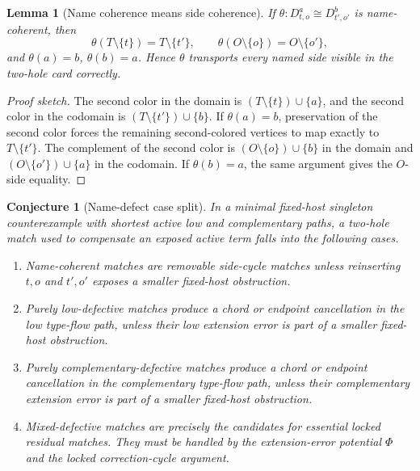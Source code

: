\documentclass[11pt]{article}
\newtheorem{lemma}{Lemma}
\newtheorem{conjecture}{Conjecture}
\begin{document}
\begin{lemma}[Name coherence means side coherence]
If \(\theta:D_{t,o}^a\cong D_{t',o'}^b\) is name-coherent, then
\[
  \theta(T\setminus\{t\})=T\setminus\{t'\},
  \qquad
  \theta(O\setminus\{o\})=O\setminus\{o'\},
\]
and \(\theta(a)=b\), \(\theta(b)=a\).  Hence \(\theta\) transports every named
side visible in the two-hole card correctly.
\end{lemma}

\begin{proof}[Proof sketch]
The second color in the domain is \((T\setminus\{t\})\cup\{a\}\), and the
second color in the codomain is \((T\setminus\{t'\})\cup\{b\}\).  If
\(\theta(a)=b\), preservation of the second color forces the remaining
second-colored vertices to map exactly to \(T\setminus\{t'\}\).  The complement
of the second color is \((O\setminus\{o\})\cup\{b\}\) in the domain and
\((O\setminus\{o'\})\cup\{a\}\) in the codomain.  If \(\theta(b)=a\), the same
argument gives the \(O\)-side equality.
\end{proof}

\begin{conjecture}[Name-defect case split]
In a minimal fixed-host singleton counterexample with shortest active low and
complementary paths, a two-hole match used to compensate an exposed active
term falls into the following cases.

\begin{enumerate}[leftmargin=2em]
  \item Name-coherent matches are removable side-cycle matches unless
  reinserting \(t,o\) and \(t',o'\) exposes a smaller fixed-host obstruction.

  \item Purely low-defective matches produce a chord or endpoint cancellation
  in the low type-flow path, unless their low extension error is part of a
  smaller fixed-host obstruction.

  \item Purely complementary-defective matches produce a chord or endpoint
  cancellation in the complementary type-flow path, unless their complementary
  extension error is part of a smaller fixed-host obstruction.

  \item Mixed-defective matches are precisely the candidates for essential
  locked residual matches.  They must be handled by the extension-error
  potential \(\Phi\) and the locked correction-cycle argument.
\end{enumerate}
\end{conjecture}
\end{document}
